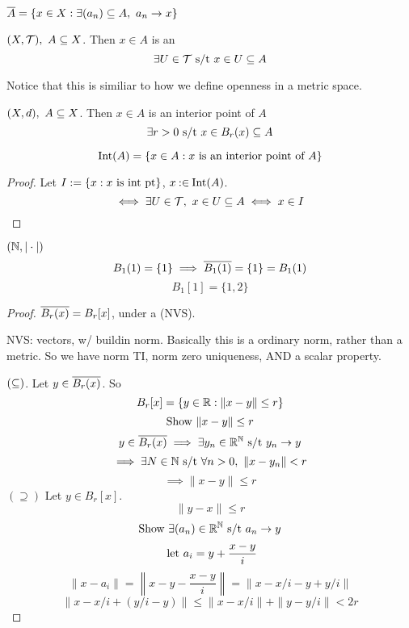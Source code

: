 \documentclass[12pt]{article}
\begin{document}
\bboxcoro
\begin{coro}
    \(\cls A=\{x\in X : \exists(a_n)\ssq A,\ a_n\to x\}\)
\end{coro}
\ebox

\bboxdefn
\begin{defn}
    \((X,\mathcal T),\ A\subseteq X\). Then \(x\in A\) is an 
    \[
        \exists U\in\mathcal T\text{ s/t } x\in U\subseteq A
    \]
    \bboxnote
    \begin{note}
        Notice that this is similiar to how we define openness in a metric 
        space.
    \end{note}
    \ebox
\end{defn}
\ebox

\bboxnote
\begin{note}
    \((X,d),\ A\subseteq X\). Then \(x\in A\) is an interior point of \(A\) 
    \[
        \exists r > 0 \text{ s/t } x \in B_r(x) \subseteq A
    \]
\end{note}
\ebox

\bboxprop
\begin{prop}
    \[
        \mathrm{Int}(A) = \{
            x \in A : x \ \mathrm{is}\  \text{an interior point of }A
        \}
    \]
\end{prop}
\ebox

\bboxproof
\begin{proof}
    Let \(I:=\{ x : x\ \mathrm{is}\ \text{int pt}\}\), \(x\mathbin{:\in}\mathrm{Int}(A)\).
    \[
        \iff\exists U\in\mathcal T,\ x\in U\subseteq A\iff x\in I
    \]
\end{proof}
\ebox

\bboxexam
\begin{exam}
    \((\mathbb N,|\cdot|)\)
    \[
        B_1(1) = \{1\}\implies \overline{B_1(1)}=\{1\}=B_1(1)
    \]
    \[
        B_1[1]=\{1,2\}
    \]
\end{exam}
\ebox

\bboxproof
\begin{proof}
     \(\overline{B_r(x)}=B_r[x]\), under a (NVS).

    NVS: vectors, w/ buildin norm. Basically this is a ordinary norm, 
    rather than a metric. So we have norm TI, norm zero uniqueness,
    AND a scalar property.

    \((\subseteq)\). Let \(y\in\overline{B_r(x)}\). So 
    \[
        B_r[x]=\{y\in\mathbb R : \|x-y\|\le r\}
    \]
    \[
        \text{Show }\|x-y\|\le r
    \]
    \[
        y\in\overline{B_r(x)}\implies\exists y_n\in\mathbb R^\mathbb N\text{ s/t } y_n\to y
    \]
    \[
        \implies\exists N\in\mathbb N\text{ s/t }\forall n>0,\
        \|x-y_n\|<r
    \]
    \[
        \implies \|x-y\|\le r
    \]
    \((\supseteq)\) Let \(y\in B_r[x]\).
    \[
        \|y-x\|\le r
    \]
    \[
        \text{Show }\exists(a_n)\in\mathbb R^\mathbb N\text{ s/t } a_n\to y
    \]
    \[
        \ \mathrm{let}\  a_i=y+\frac{x-y}i
    \]
    \[
        \|x-a_i\|=\left\|x-y-\frac{x-y}i\right\|=\|x-x/i-y+y/i\|
    \]
    \[
        \|x-x/i+(y/i-y)\|\le\|x-x/i\|+\|y-y/i\|<2r
    \]
\end{proof}
\ebox


\end{document}

